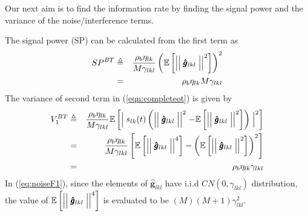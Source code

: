 \documentclass[10pt, a4paper, twoside,fleqn]{article}
\begin{document}
Our next aim is to find the information rate by finding the signal power and the variance of the noise/interference terms. 

The signal power (SP) can be calculated from the first term as
\begin{eqnarray}
	SP^{BT} &\triangleq&  \frac{\rho_b\eta_{lk}}{M\gamma_{lkl}}\left(\mathbb{E}\left[\Bigm|\Bigm|\pmb{\hat g}_{lkl}\Bigm|\Bigm|^2\right]\right)^2 \nonumber \\
            &=& \rho_b\eta_{lk}M\gamma_{lkl}
\end{eqnarray}
The variance of second term in (\ref{eqn:completeot}) is given by
\begin{eqnarray}\label{eq:noiseF1}
	V_1^{BT} &\triangleq& \frac{\rho_b \eta_{lk}}{M\gamma_{lkl}}   \mathbb{E}\left[\Bigm|s_{lk}(t)\left(\Bigm|\Bigm|\pmb{\hat g}_{lkl}\Bigm|\Bigm|^2- \mathbb{E}\left[\Bigm|\Bigm|\pmb{\hat  g}_{lkl}\Bigm|\Bigm|^2\right] \right)\Bigm|^2\right] \nonumber \\
	    &=& \frac{\rho_b \eta_{lk}}{M\gamma_{lkl}}\left[\mathbb{E}\left[\Bigm|\Bigm|\pmb{\hat g}_{lkl}\Bigm|\Bigm|^4\right] - \left(\mathbb{E}\left[\Bigm|\Bigm|\pmb{\hat g}_{lkl}\Bigm|\Bigm|^2\right]\right)^2 \right] \nonumber  \\
	    &=& \rho_b\eta_{lk}\gamma_{lkl}
\end{eqnarray}
In (\ref{eq:noiseF1}), since the elements of $\pmb{\hat g}_{lkl}$ have i.i.d  $CN(0,\gamma_{lkl})$ distribution, the value of $\mathbb{E}\left[\Bigm|\Bigm|\pmb{\hat g}_{lkl}\Bigm|\Bigm|^4\right]$ is evaluated to be $(M)(M+1)\gamma_{lkl}^2$.
\end{document}
